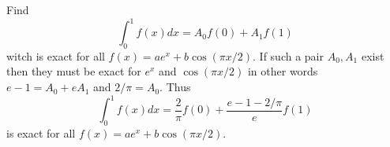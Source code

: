 \documentclass[12pt]{article}
\makeatletter
\theoremstyle{homework}
\newenvironment{exercise}[1]
{\def\@currentlabel{#1}\exercisecore}
{\endexercisecore}
\makeatother
\begin{document}
\begin{exercise}

10.2
\end{exercise}
Find 
$$\int_0^1f(x)dx=A_0f(0)+A_1f(1)$$
witch is exact for all $f(x)=ae^x+b\cos(\pi x/2)$.
If such a pair $A_0,A_1$ exist then they must be exact for $e^x$ and $\cos(\pi x/2)$ in other words $e-1=A_0+eA_1$ and $2/\pi=A_0$.  Thus 
$$\int_0^1f(x)dx=\frac{2}{\pi} f(0)+\frac{e-1-2/\pi}{e} f(1)$$
is exact for all $f(x)=ae^x+b\cos(\pi x/2)$.
\end{document}

